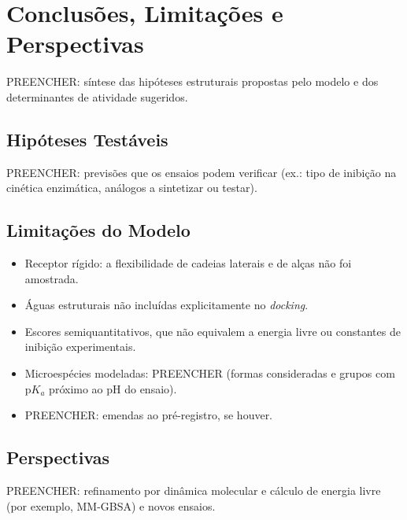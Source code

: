 \section{Conclusões, Limitações e Perspectivas} \label{section: conclusions}

PREENCHER: síntese das hipóteses estruturais propostas pelo modelo e dos determinantes de atividade sugeridos.

\subsection{Hipóteses Testáveis}
PREENCHER: previsões que os ensaios podem verificar (ex.: tipo de inibição na cinética enzimática, análogos a sintetizar ou testar).

\subsection{Limitações do Modelo}
\begin{itemize}
    \item Receptor rígido: a flexibilidade de cadeias laterais e de alças não foi amostrada.
    \item Águas estruturais não incluídas explicitamente no \textit{docking}.
    \item Escores semiquantitativos, que não equivalem a energia livre ou constantes de inibição experimentais.
    \item Microespécies modeladas: PREENCHER (formas consideradas e grupos com $\text{p}K_a$ próximo ao pH do ensaio).
    \item PREENCHER: emendas ao pré-registro, se houver.
\end{itemize}

\subsection{Perspectivas}
PREENCHER: refinamento por dinâmica molecular e cálculo de energia livre (por exemplo, MM-GBSA) e novos ensaios.
